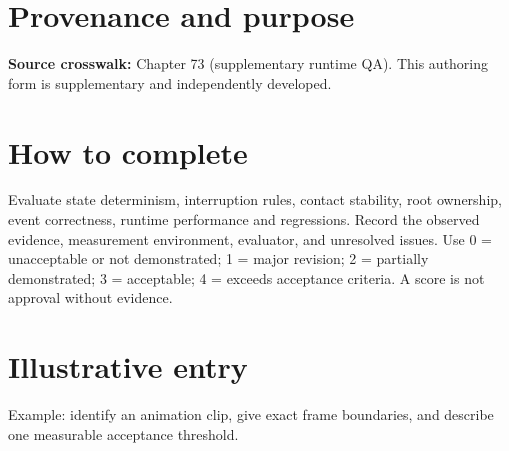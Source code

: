 \documentclass[10pt,letterpaper]{article}
\begin{document}
\makedoctitle
\makedocsummary

\section{Provenance and purpose}
\textbf{Source crosswalk:} Chapter 73 (supplementary runtime QA). This authoring form is supplementary and independently developed.
\section{How to complete}
Evaluate state determinism, interruption rules, contact stability, root ownership, event correctness, runtime performance and regressions. Record the observed evidence, measurement environment, evaluator, and unresolved issues. Use 0 = unacceptable or not demonstrated; 1 = major revision; 2 = partially demonstrated; 3 = acceptable; 4 = exceeds acceptance criteria. A score is not approval without evidence.
\section{Illustrative entry}
Example: identify an animation clip, give exact frame boundaries, and describe one measurable acceptance threshold.
\end{document}
